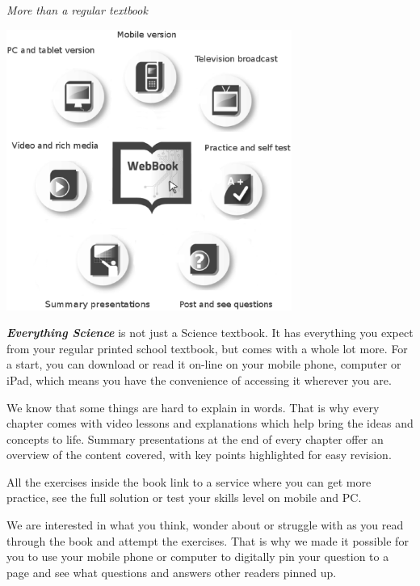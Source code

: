 
\newpage
\thispagestyle{empty}

{\normalfont\sffamily\fontsize{22}\normalfont\itshape More than a regular textbook} \par

\begin{center}
\includegraphics[width=0.70\textwidth]{title_images/morethantextbook.eps}
\end{center}

\par
{\Large
\textbf{\textit{Everything Science}} is not just a Science textbook. It has everything you expect from
your regular printed school textbook, but comes with a whole lot more. For a start, you can download or read it
on-line on your mobile phone, computer or iPad, which means you have the convenience of accessing
it wherever you are.\par


We know that some things are hard to explain in words. That is why every chapter comes with video
lessons and explanations which help bring the ideas and concepts to life. Summary presentations at
the end of every chapter offer an overview of the content covered, with key points highlighted for easy
revision.\par


All the exercises inside the book link to a service where you can get more practice, see the full solution
or test your skills level on mobile and PC.\par


We are interested in what you think, wonder about or struggle with as you read through the book and
attempt the exercises. That is why we made it possible for you to use your mobile phone or computer to
digitally pin your question to a page and see what questions and answers other readers pinned up.\par


}




